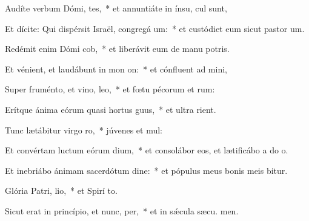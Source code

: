 \item Audíte verbum Dómi, tes,~* et annuntiáte in ínsu,  cul sunt,
\item Et dícite: Qui dispérsit Israël, congregá um:~* et custódiet eum sicut pastor  um.
\item Redémit enim Dómi cob,~* et liberávit eum de manu potris.
\item Et vénient, et laudábunt in mon on:~* et cónfluent ad  mini,
\item Super fruménto, et vino,  leo,~* et fœtu pécorum et rum:
\item Erítque ánima eórum quasi hortus guus,~* et ultra  rient.
\item Tunc lætábitur virgo  ro,~* júvenes et  mul:
\item Et convértam luctum eórum  dium,~* et consolábor eos, et lætificábo a do o.
\item Et inebriábo ánimam sacerdótum dine:~* et pópulus meus bonis meis bitur.
\item Glória Patri,  lio,~* et Spirí to.
\item Sicut erat in princípio, et nunc,  per,~* et in sǽcula sæcu. men.
